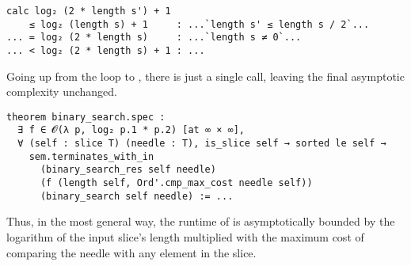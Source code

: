 \begin{verbatim}
calc log₂ (2 * length s') + 1
    ≤ log₂ (length s) + 1     : ...`length s' ≤ length s / 2`...
... = log₂ (2 * length s)     : ...`length s ≠ 0`...
... < log₂ (2 * length s) + 1 : ...
\end{verbatim}

Going up from the loop to , there is just a single call, leaving
the final asymptotic complexity unchanged.

\begin{verbatim}
theorem binary_search.spec :
  ∃ f ∈ 𝓞(λ p, log₂ p.1 * p.2) [at ∞ × ∞],
  ∀ (self : slice T) (needle : T), is_slice self → sorted le self →
    sem.terminates_with_in
      (binary_search_res self needle)
      (f (length self, Ord'.cmp_max_cost needle self))
      (binary_search self needle) := ...
\end{verbatim}

Thus, in the most general way, the runtime of  is
asymptotically bounded by the logarithm of the input slice's length multiplied
with the maximum cost of comparing the needle with any element in the slice.